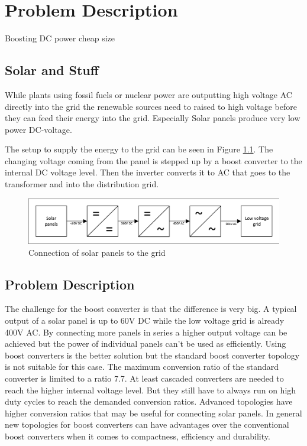 \chapter{Problem Description}\label{ch:probdesc}
Boosting DC power
cheap
size

\section{Solar and Stuff}
While plants using fossil fuels or nuclear power are outputting high voltage AC directly into the grid the renewable sources need to raised to high voltage before they can feed their energy into the grid.
Especially Solar panels produce very low power DC-voltage. 

The setup to supply the energy to the grid can be seen in Figure \ref{fig:SolarConverters}.
The changing voltage coming from the panel is stepped up by a boost converter to the internal DC voltage level. 
Then the inverter converts it to AC that goes to the transformer and into the distribution grid.

\begin{figure}[H]
   \centering
   \includegraphics[width=\textwidth]{figures/Problem/SolarConverters.pdf}
    \caption{Connection of solar panels to the grid}
	\label{fig:SolarConverters}
\end{figure}

\section{Problem Description}
The challenge for the boost converter is that the difference is very big.
A typical output of a solar panel is up to 60V DC while the low voltage grid is already 400V AC.
By connecting more panels in series a higher output voltage can be achieved but the power of individual panels can't be used as efficiently.
Using boost converters is the better solution but the standard boost converter topology is not suitable for this case. 
The maximum conversion ratio of the standard converter is limited to a ratio 7.7.
At least cascaded converters are needed to reach the higher internal voltage level.
But they still have to always run on high duty cycles to reach the demanded conversion ratios.
Advanced topologies have higher conversion ratios that may be useful for connecting solar panels.
In general new topologies for boost converters can have advantages over the conventional boost converters when it comes to compactness, efficiency and durability.